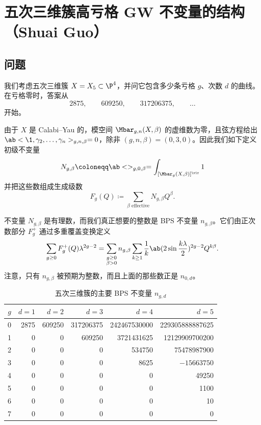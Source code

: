 \section{五次三维簇高亏格 GW 不变量的结构（Shuai Guo）}%
\label{sec:Structure of higher-genus GW invariants of the quintic (Shuai Guo)}

\subsection{问题}%
\label{sub:The problem (Guo)}

我们考虑五次三维簇 \(X = X_5 \subset \P^4\)，并问它包含多少条亏格 \(g\)、次数 \(d\) 的曲线。在亏格零时，答案从
\[ 2875, \qquad 609250, \qquad 317206375, \qquad \ldots \]
开始。

由于 \(X\) 是 Calabi–Yau 的，模空间 \(\Mbar_{g,n}(X,\beta)\) 的虚维数为零，且弦方程给出 \(\ab<\1, \gamma_2, \ldots, \gamma_n>_{g,n,\beta} = 0\)，除非 \((g,n,\beta) = (0,3,0)\)。因此我们如下定义初级不变量
\[ N_{g,\beta} \coloneqq \ab<>_{g,0,\beta} = \int_{[\Mbar_g(X,\beta)]^{\vir}} 1 \]
并把这些数组成生成级数
\[ F_g(Q) \coloneqq \sum_{\beta \text{ effective}} N_{g,\beta}Q^{\beta}. \]

不变量 \(N_{g,\beta}\) 是有理数，而我们真正想要的整数是 BPS 不变量 \(n_{g,\beta}\)。它们由正次数部分 \(F_g^+\) 通过多重覆盖变换定义
\[ \sum_{g \geq 0} F_g^+(Q)\lambda^{2g-2} = \sum_{\substack{g \geq 0 \\ \beta > 0}} n_{g,\beta} \sum_{k \geq 1} \frac{1}{k} \ab(2 \sin \frac{k\lambda}{2})^{2g-2}Q^{k\beta}. \]
注意，只有 \(n_{g,\beta}\) 被预期为整数，而且上面的那些数正是 \(n_{0,d}\)。

\begin{table}[htpb]
    \centering
    \caption{五次三维簇的主要 BPS 不变量 \(n_{g,d}\)}
    \label{tab:quinticbps}
    \begin{tabular}{crrrrr}
        \toprule
        \(g\) & \(d=1\) & \(d=2\) & \(d=3\) & \(d=4\) & \(d=5\) \\
        \midrule
        0 & 2875 & 609250 & 317206375 & 242467530000 & 229305888887625 \\
        1 & 0 & 0 & 609250 & 3721431625 & 12129909700200 \\
        2 & 0 & 0 & 0 & 534750 & 75478987900 \\
        3 & 0 & 0 & 0 & 8625 & \(-15663750\) \\
        4 & 0 & 0 & 0 & 0 & 49250 \\
        5 & 0 & 0 & 0 & 0 & 1100 \\
        6 & 0 & 0 & 0 & 0 & 10 \\
        7 & 0 & 0 & 0 & 0 & 0 \\
        \bottomrule
    \end{tabular}
\end{table}

